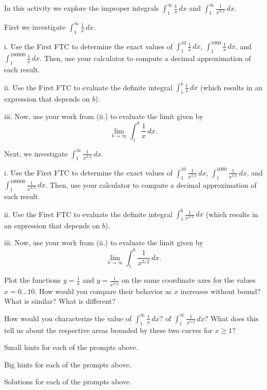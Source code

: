 \begin{activity} \label{A:6.5.1}  In this activity we explore the improper integrals $ \int_1^{\infty} \frac{1}{x} \, dx$ and $ \int_1^{\infty} \frac{1}{x^{3/2}} \, dx$.
\ba
	\item First we investigate $ \int_1^{\infty} \frac{1}{x} \, dx$.
	\be
		\item[i.] Use the First FTC to determine the exact values of $ \int_1^{10} \frac{1}{x} \, dx$, $ \int_1^{1000} \frac{1}{x} \, dx$, and $ \int_1^{100000} \frac{1}{x} \, dx$.  Then, use your calculator to compute a decimal approximation of each result.
		\item[ii.]  Use the First FTC to evaluate the definite integral $ \int_1^{b} \frac{1}{x} \, dx$ (which results in an expression that depends on $b$).
		\item[iii.]  Now, use your work from (ii.) to evaluate the limit given by
	$$\lim_{b \to \infty}  \int_1^{b} \frac{1}{x} \, dx.$$
	\ee
	\item Next, we investigate $ \int_1^{\infty} \frac{1}{x^{3/2}} \, dx$.
	\be
		\item[i.] Use the First FTC to determine the exact values of $ \int_1^{10} \frac{1}{x^{3/2}} \, dx$, $ \int_1^{1000} \frac{1}{x^{3/2}} \, dx$, and $ \int_1^{100000} \frac{1}{x^{3/2}} \, dx$.  Then, use your calculator to compute a decimal approximation of each result.
		\item[ii.]  Use the First FTC to evaluate the definite integral $ \int_1^{b} \frac{1}{x^{3/2}} \, dx$ (which results in an expression that depends on $b$).
		\item[iii.]  Now, use your work from (ii.) to evaluate the limit given by
	$$\lim_{b \to \infty}  \int_1^{b} \frac{1}{x^{3/2}} \, dx.$$
	\ee
	\item Plot the functions $y = \frac{1}{x}$ and $y = \frac{1}{x^{3/2}}$ on the same coordinate axes for the values $x = 0 \ldots 10$.  How would you compare their behavior as $x$ increases without bound?  What is similar?  What is different?
	\item How would you characterize the value of $ \int_1^{\infty} \frac{1}{x} \, dx$? of $ \int_1^{\infty} \frac{1}{x^{3/2}} \, dx$?  What does this tell us about the respective areas bounded by these two curves for $x \ge 1$?
\ea

\end{activity}
\begin{smallhint}
\ba
	\item Small hints for each of the prompts above.
\ea
\end{smallhint}
\begin{bighint}
\ba
	\item Big hints for each of the prompts above.
\ea
\end{bighint}
\begin{activitySolution}
\ba
	\item Solutions for each of the prompts above.
\ea
\end{activitySolution}
\aftera